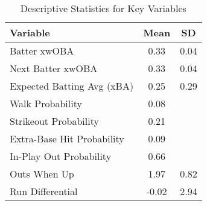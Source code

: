 \begin{table}[ht]
\centering
\caption{Descriptive Statistics for Key Variables} 
\label{tab:desc_stats}
\begin{tabular}{lcc}
  \hline
Variable & Mean & SD \\ 
  \hline
Batter xwOBA & 0.33 & 0.04 \\ 
  Next Batter xwOBA & 0.33 & 0.04 \\ 
  Expected Batting Avg (xBA) & 0.25 & 0.29 \\ 
  Walk Probability & 0.08 &  \\ 
  Strikeout Probability & 0.21 &  \\ 
  Extra-Base Hit Probability & 0.09 &  \\ 
  In-Play Out Probability & 0.66 &  \\ 
  Outs When Up & 1.97 & 0.82 \\ 
  Run Differential & -0.02 & 2.94 \\ 
   \hline
\end{tabular}
\end{table}
